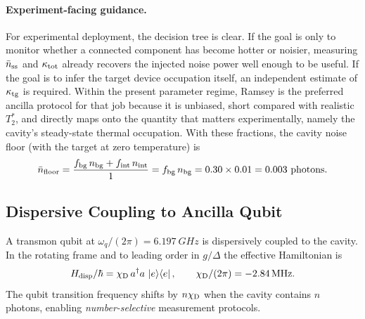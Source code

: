 \documentclass[11pt,a4paper]{article}
\newcommand{\nbar}{\bar{n}}
\newcommand{\kappat}{\kappa_{\rm tot}}
\newcommand{\kappatg}{\kappa_{\rm tg}}
\newcommand{\nbg}{n_{\rm bg}}
\newcommand{\nss}{\nbar_{\rm ss}}
\newcommand{\chiD}{\chi_{\rm D}}
\begin{document}
\paragraph{Experiment-facing guidance.}
For experimental deployment, the decision tree is clear. If the goal is only to monitor whether a connected component has become hotter or noisier, measuring $\nss$ and $\kappat$ already recovers the injected noise power well enough to be useful. If the goal is to infer the target device occupation itself, an independent estimate of $\kappatg$ is required. Within the present parameter regime, Ramsey is the preferred ancilla protocol for that job because it is unbiased, short compared with realistic $T_2^*$, and directly maps onto the quantity that matters experimentally, namely the cavity's steady-state thermal occupation.
With these fractions, the cavity noise floor (with the target at zero
temperature) is
\begin{equation}
  \nbar_{\rm floor}
    = \frac{f_{\rm bg}\,\nbg + f_{\rm int}\,n_{\rm int}}{1}
    = f_{\rm bg}\,\nbg
    = 0.30 \times 0.01 = 0.003\text{ photons.}
\end{equation}

\subsection{Dispersive Coupling to Ancilla Qubit}
\label{sec:dispersive}

A transmon qubit at $\omega_q/(2\pi) = \SI{6.197}{GHz}$ is dispersively
coupled to the cavity.  In the rotating frame and to leading order in $g/\Delta$
the effective Hamiltonian is
\begin{equation}
  H_{\rm disp}/\hbar = \chiD\, a^\dagger a\, \ket{e}\!\bra{e},
  \qquad \chiD/(2\pi) = -\SI{2.84}{MHz}.
  \label{eq:dispersive}
\end{equation}
The qubit transition frequency shifts by $n\chiD$ when the cavity contains
$n$ photons, enabling \emph{number-selective} measurement protocols.
\end{document}
